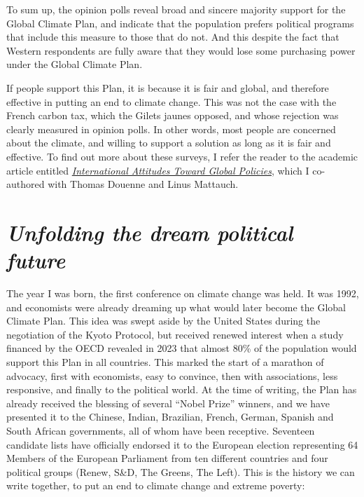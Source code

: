 \documentclass[a5paper,english,openany]{memoir}
\begin{document}
To sum up, the opinion polls reveal broad and sincere majority support for the Global Climate Plan, and indicate that the population prefers political programs that include this measure to those that do not. And this despite the fact that Western respondents are fully aware that they would lose some purchasing power under the Global Climate Plan. 

If people support this Plan, it is because it is fair and global, and therefore effective in putting an end to climate change. This was not the case with the French carbon tax, which the Gilets jaunes opposed, and whose rejection was clearly measured in opinion polls. In other words, most people are concerned about the climate, and willing to support a solution as long as it is fair and effective. 
To find out more about these surveys, I refer the reader to the academic article entitled \href{https://papers.ssrn.com/sol3/papers.cfm?abstract_id=4448523}{\textit{International Attitudes Toward Global Policies}}, which I co-authored with Thomas Douenne and Linus Mattauch. 

\chapter*{\textit{Unfolding the dream political future}}\label{ch:narr_reve}

The year I was born, the first conference on climate change was held. It was 1992, and economists were already dreaming up what would later become the Global Climate Plan. This idea was swept aside by the United States during the negotiation of the Kyoto Protocol, but received renewed interest when a study financed by the OECD revealed in 2023 that almost 80\% of the population would support this Plan in all countries. This marked the start of a marathon of advocacy, first with economists, easy to convince, then with associations, less responsive, and finally to the political world. At the time of writing, the Plan has already received the blessing of several ``Nobel Prize'' winners, and we have presented it to the Chinese, Indian, Brazilian, French, German, Spanish and South African governments, all of whom have been receptive. Seventeen candidate lists have officially endorsed it to the European election representing 64 Members of the European Parliament from ten different countries and four political groups (Renew, S\&D, The Greens, The Left). %
This is the history we can write together, to put an end to climate change and extreme poverty: 
\end{document}
